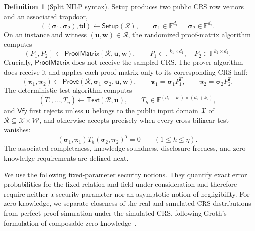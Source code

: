 \documentclass[11pt]{article}
\theoremstyle{definition}
\newtheorem{definition}[theorem]{Definition}
\newcommand{\F}{\mathbb F}
\newcommand{\cR}{\mathcal R}
\newcommand{\Setup}{\mathsf{Setup}}
\newcommand{\Prove}{\mathsf{Prove}}
\newcommand{\Vfy}{\mathsf{Vfy}}
\newcommand{\td}{\mathsf{td}}
\newcommand{\ProofMatrix}{\mathsf{ProofMatrix}}
\newcommand{\Test}{\mathsf{Test}}
\begin{document}
\begin{definition}[Split NILP syntax]
Setup produces two public CRS row vectors and an associated trapdoor,
\[
  ((\boldsymbol{\sigma}_1,\boldsymbol{\sigma}_2),\td)
  \leftarrow\Setup(\cR),
  \qquad
  \boldsymbol{\sigma}_1\in\F^{d_1},\quad
  \boldsymbol{\sigma}_2\in\F^{d_2}.
\]
On an instance and witness $(\mathbf u,\mathbf w)\in\cR$, the randomized
proof-matrix algorithm computes
\[
  (P_1,P_2)\leftarrow\ProofMatrix(\cR,\mathbf u,\mathbf w),
  \qquad
  P_1\in\F^{k_1\times d_1},\quad
  P_2\in\F^{k_2\times d_2}.
\]
Crucially, $\ProofMatrix$ does not receive the sampled CRS.  The prover
algorithm does receive it and applies each proof matrix only to its
corresponding CRS half:
\[
  (\boldsymbol{\pi}_1,\boldsymbol{\pi}_2)
  \leftarrow
  \Prove(\cR,\boldsymbol{\sigma}_1,\boldsymbol{\sigma}_2,
         \mathbf u,\mathbf w),
  \qquad
  \boldsymbol{\pi}_1=\boldsymbol{\sigma}_1P_1^T,\qquad
  \boldsymbol{\pi}_2=\boldsymbol{\sigma}_2P_2^T.
\]
The deterministic test algorithm computes
\[
  (T_1,\ldots,T_\eta)\leftarrow\Test(\cR,\mathbf u),
  \qquad
  T_h\in\F^{(d_1+k_1)\times(d_2+k_2)},
\]
and $\Vfy$ first rejects unless $\mathbf u$ belongs to the public input
domain $\mathcal X$ of $\cR\subseteq\mathcal X\times\mathcal W$, and otherwise
accepts precisely when every cross-bilinear test vanishes:
\[
  (\boldsymbol{\sigma}_1,\boldsymbol{\pi}_1)
  T_h
  (\boldsymbol{\sigma}_2,\boldsymbol{\pi}_2)^T=0
  \qquad(1\le h\le\eta).
\]
The associated completeness, knowledge soundness, disclosure freeness, and zero-knowledge requirements are defined next.
\end{definition}

We use the following fixed-parameter security notions.  They quantify exact
error probabilities for the fixed relation and field under consideration and
therefore require neither a security parameter nor an asymptotic notion of
negligibility.  For zero knowledge, we separate closeness of the real and
simulated CRS distributions from perfect proof simulation under the simulated
CRS, following Groth's formulation of composable zero
knowledge~\cite{Groth06CZK}.
\end{document}

